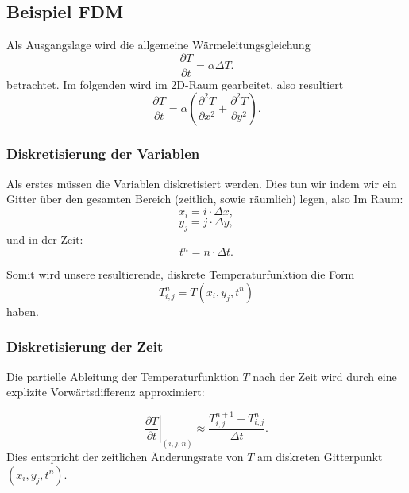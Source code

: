 \subsection{Beispiel FDM}

Als Ausgangslage wird die allgemeine Wärmeleitungsgleichung
\begin{equation}
	\frac{\partial T}{\partial t}
	=
	\alpha \Delta T.
	\label{parallelisierung:eq:Wärmeleitung_alg}
\end{equation}
betrachtet.
Im folgenden wird im 2D-Raum gearbeitet, also resultiert
\begin{equation}
	\frac{\partial T}{\partial t}
	=
	\alpha \left(
	\frac{\partial^2 T}{\partial x^2}
	+
	\frac{\partial^2 T}{\partial y^2}
	\right).
	\label{parallelisierung:eq:Wärmeleitung_2D}
\end{equation}


\subsubsection{Diskretisierung der Variablen}

Als erstes müssen die Variablen diskretisiert werden. Dies tun wir indem wir ein Gitter über den gesamten Bereich (zeitlich, sowie räumlich) legen, also
Im Raum:
\begin{equation}
	x_i
	=
	i \cdot \Delta x,
\end{equation}
\begin{equation}
	y_j
	=
	j \cdot \Delta y,
\end{equation}
und in der Zeit:
\begin{equation}
	t^n
	=
	n \cdot \Delta t.
\end{equation}

Somit wird unsere resultierende, diskrete Temperaturfunktion die Form
\begin{equation}
	T^n_{i,j}
	=
	T(x_i,y_j,t^n)
\end{equation}
haben.


\subsubsection{Diskretisierung der Zeit}

Die partielle Ableitung der Temperaturfunktion \( T \) nach der Zeit wird durch eine explizite Vorwärtsdifferenz approximiert:

\begin{equation}
	\label{parallelisierung:eq:discrete_time_derivative}
	\left. \frac{\partial T}{\partial t}\right|_{(i,j,n)}
	\approx
	\frac{T_{i,j}^{n+1} - T_{i,j}^n}{\Delta t}.
\end{equation}
Dies entspricht der zeitlichen Änderungsrate von \( T \) am diskreten Gitterpunkt \( (x_i, y_j, t^n) \).

